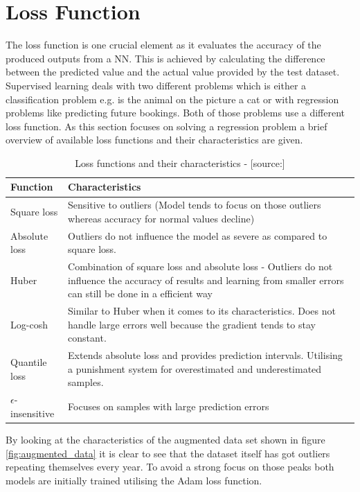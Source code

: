 \section{Loss Function}
\label{sec:loss_func}
The loss function is one crucial element as it evaluates the accuracy of the produced outputs from a NN. This is achieved by calculating the difference between the predicted value and the actual value provided by the test dataset. Supervised learning deals with two different problems which is either a classification problem e.g. is the animal on the picture a cat or with regression problems like predicting future bookings. Both of those problems use a different loss function.\cite{loss_func} As this section focuses on solving a regression problem a brief overview of available loss functions and their characteristics are given. 

\begin{table}[htbp]
	\centering
		\begin{tabularx}{\textwidth}{|l|X|}
		\hline
		\rowcolor[gray]{0.9}
		Function & Characteristics \\
		\hline
		Square loss &Sensitive to outliers (Model tends to focus on those outliers whereas accuracy for normal values decline)\\
		 \hline
		Absolute loss & Outliers do not influence the model as  severe as compared to square loss.  \\
		\hline
		Huber & Combination of square loss and absolute loss - Outliers do not influence the accuracy of results and learning from smaller errors can still be done in a efficient way  \\
		\hline
		Log-cosh & Similar to Huber when it comes to its characteristics. Does not handle large errors well because the gradient tends to stay constant. \\
		\hline
		Quantile loss & Extends absolute loss and provides prediction intervals. Utilising a punishment system for overestimated and underestimated samples. \\
		\hline
		$\epsilon$-insensitive & Focuses on samples with large prediction errors \\
		\hline	
		\end{tabularx}
	\label{tab:loss_function}
	\caption{Loss functions and their characteristics - [source:\cite{loss_func}]}
\end{table}

By looking at the characteristics of the augmented data set shown in figure \ref{fig:augmented_data} it is clear to see that the dataset itself has got outliers repeating themselves every year. To avoid a strong focus on those peaks both models are initially trained utilising the Adam loss function.

